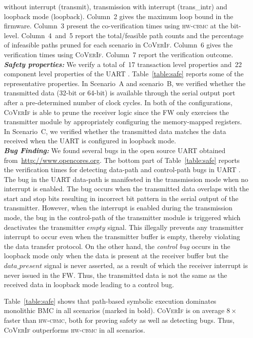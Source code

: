 \documentclass[sigconf]{acmart}
\newcommand{\tool}[1]{\textsc{#1}\xspace}
\newcommand{\hwcbmcv}{\tool{hw-cbmc}}
\newcommand{\verifox}{\tool{CoVerIf}}
\begin{document}
without interrupt (transmit), transmission with interrupt (trans\_intr) and
loopback mode (loopback).  Column~2 gives the maximum loop bound in the
firmware.  Column~3 present the co-verification times using \hwcbmcv
at the bit-level.  Column~4~and~5 report the total/feasible path counts and the 
percentage of infeasible paths pruned for each scenario in \verifox.  
Column~6 gives the verification times using \verifox.  Column~7 report 
the verification outcome.\\ 
%
\textbf{\emph{Safety properties:}}
We verify a total of~17 transaction level properties and~22 component level 
properties of the UART .  Table~\ref{table:safe} reports some of the
representative properties.  In Scenario~A and scenario~B, we verified whether
the transmitted data (32-bit or 64-bit) is available through the serial
output port after a pre-determined number of clock cycles.
In both of the configurations, \verifox is able to prune the receiver logic since the
FW only exercises the transmitter module by appropriately configuring
the memory-mapped registers.  In Scenario~C, we verified whether the transmitted
data matches the data received when the UART is configured in loopback
mode.\\ 
\textbf{\emph{Bug Finding:}}
We found several bugs in the open source UART  obtained from~\url{http://www.opencores.org}.  
The bottom part of Table~\ref{table:safe} reports the verification
times for detecting data-path and control-path bugs in UART .  
The bug in the UART data-path is manifested in the transmission mode when no
interrupt is enabled.  The bug occurs when the transmitted data overlaps
with the start and stop bits resulting in incorrect bit pattern in the
serial output of the transmitter.  However, when the interrupt is enabled
during the transmission mode, the bug in the control-path of the transmitter
module is triggered which deactivates the transmitter $empty$ signal.  This
illegally prevents any transmitter interrupt to occur even when the
transmitter buffer is empty, thereby violating the data transfer protocol. 
On the other hand, the \emph{control bug} occurs in the loopback mode only when the
data is present at the receiver buffer but the $data\_present$ signal is
never asserted, as a result of which the receiver interrupt is never issued
in the FW. Thus, the transmitted data is not the same as the received
data in loopback mode leading to a control bug.

Table~\ref{table:safe} shows that path-based symbolic execution dominates
monolithic BMC in all scenarios (marked in bold). \verifox is on average 
$8\times$ faster than \hwcbmcv, both for proving safety as well as 
detecting bugs.  Thus, \verifox outperforms \hwcbmcv in all scenarios. 
\end{document}
